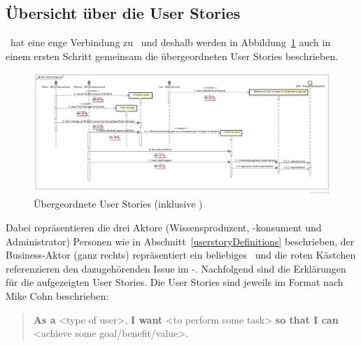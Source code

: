 		
	\begin{landscape}
	\subsection{Übersicht über die User Stories}
	
		\eeppi\ hat eine enge Verbindung zu \cdar\ und deshalb werden in Abbildung~\ref{fig:UserStoryDiagram} auch in einem ersten Schritt gemeinsam die übergeordneten User Stories beschrieben.
	
		\begin{figure}[H]
				\includegraphics[width=0.95\linewidth]{media/diagrams/UserStoryDiagram.png}
				\centering
				\caption{Übergeordnete User Stories (inklusive \cdar)}
				\label{fig:UserStoryDiagram}
		\end{figure}
		
		Dabei repräsentieren die drei Aktore (Wissensproduzent, -konsument und Administrator) Personen wie in Abschnitt~\ref{userstoryDefinitions} beschrieben,
		der Business-Aktor (ganz rechts) repräsentiert ein beliebiges \ppt\ und die roten Kästchen referenzieren den dazugehörenden Issue im \eeppi-\ppt.
		Nachfolgend sind die Erklärungen für die aufgezeigten User Stories.
		Die User Stories sind jeweils im Format nach Mike Cohn \cite{rasmusson_agile_2012} beschrieben:
		\begin{quote}
			\textbf{As a} <type of user>,\newline
			\textbf{I want} <to perform some task>\newline
			\textbf{so that I can} <achieve some goal/benefit/value>.
		\end{quote}
	\end{landscape}
	
		
			
		
			
